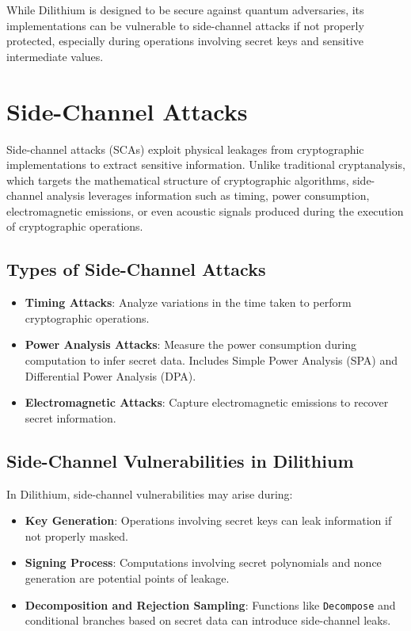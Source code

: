 While Dilithium is designed to be secure against quantum adversaries, its implementations can be vulnerable to side-channel attacks if not properly protected, especially during operations involving secret keys and sensitive intermediate values.

\section{Side-Channel Attacks}

Side-channel attacks (\acp{SCA}) exploit physical leakages from cryptographic implementations to extract sensitive information. Unlike traditional cryptanalysis, which targets the mathematical structure of cryptographic algorithms, side-channel analysis leverages information such as timing, power consumption, electromagnetic emissions, or even acoustic signals produced during the execution of cryptographic operations.

\subsection{Types of Side-Channel Attacks}

\begin{itemize}
    \item \textbf{Timing Attacks}: Analyze variations in the time taken to perform cryptographic operations.
    \item \textbf{Power Analysis Attacks}: Measure the power consumption during computation to infer secret data. Includes Simple Power Analysis (SPA) and Differential Power Analysis (DPA).
    \item \textbf{Electromagnetic Attacks}: Capture electromagnetic emissions to recover secret information.
\end{itemize}

\subsection{Side-Channel Vulnerabilities in Dilithium}

In Dilithium, side-channel vulnerabilities may arise during:

\begin{itemize}
    \item \textbf{Key Generation}: Operations involving secret keys can leak information if not properly masked.
    \item \textbf{Signing Process}: Computations involving secret polynomials and nonce generation are potential points of leakage.
    \item \textbf{Decomposition and Rejection Sampling}: Functions like \texttt{Decompose} and conditional branches based on secret data can introduce side-channel leaks.
\end{itemize}


